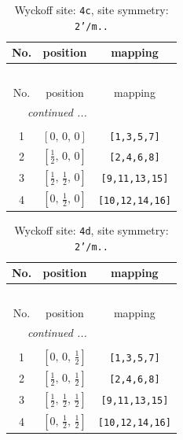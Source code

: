 \documentclass[fleqn,8pt]{jsarticle}
\begin{document}
\renewcommand{\arraystretch}{1.2}
\begin{longtable}{ccc}
\caption{Wyckoff site: {\tt 4c}, site symmetry: {\tt 2'/m..}}
 \\
 \hline \hline
No. & position & mapping \\ \hline \endfirsthead

\multicolumn{2}{l}{\tablename\ \thetable{}} \\
 \hline \hline
No. & position & mapping \\ \hline \endhead

 \hline \hline
\multicolumn{2}{r}{\footnotesize\it continued ...} \\ \endfoot

 \hline \hline
\multicolumn{2}{r}{} \\ \endlastfoot

1 & $\left[ 0,\, 0,\, 0 \right]$ & {\tt [1,3,5,7]} \\ \hline
2 & $\left[ \frac{1}{2},\, 0,\, 0 \right]$ & {\tt [2,4,6,8]} \\ \hline
3 & $\left[ \frac{1}{2},\, \frac{1}{2},\, 0 \right]$ & {\tt [9,11,13,15]} \\ \hline
4 & $\left[ 0,\, \frac{1}{2},\, 0 \right]$ & {\tt [10,12,14,16]} \\
\end{longtable}
\renewcommand{\arraystretch}{1.2}
\begin{longtable}{ccc}
\caption{Wyckoff site: {\tt 4d}, site symmetry: {\tt 2'/m..}}
 \\
 \hline \hline
No. & position & mapping \\ \hline \endfirsthead

\multicolumn{2}{l}{\tablename\ \thetable{}} \\
 \hline \hline
No. & position & mapping \\ \hline \endhead

 \hline \hline
\multicolumn{2}{r}{\footnotesize\it continued ...} \\ \endfoot

 \hline \hline
\multicolumn{2}{r}{} \\ \endlastfoot

1 & $\left[ 0,\, 0,\, \frac{1}{2} \right]$ & {\tt [1,3,5,7]} \\ \hline
2 & $\left[ \frac{1}{2},\, 0,\, \frac{1}{2} \right]$ & {\tt [2,4,6,8]} \\ \hline
3 & $\left[ \frac{1}{2},\, \frac{1}{2},\, \frac{1}{2} \right]$ & {\tt [9,11,13,15]} \\ \hline
4 & $\left[ 0,\, \frac{1}{2},\, \frac{1}{2} \right]$ & {\tt [10,12,14,16]} \\
\end{longtable}
\end{document}
